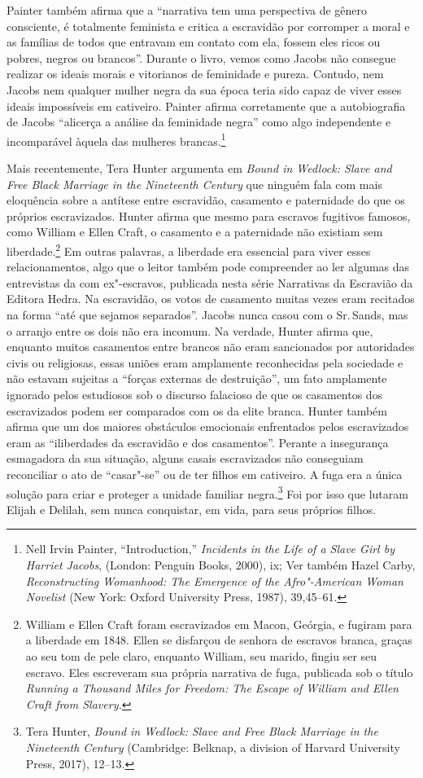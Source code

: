 Painter também afirma que a ``narrativa tem uma perspectiva de gênero
consciente, é totalmente feminista e critica a escravidão por corromper
a moral e as famílias de todos que entravam em contato com ela, fossem
eles ricos ou pobres, negros ou brancos''. Durante o livro, vemos como
Jacobs não consegue realizar os ideais morais e vitorianos de feminidade
e pureza. Contudo, nem Jacobs nem qualquer mulher negra da sua época
teria sido capaz de viver esses ideais impossíveis em cativeiro. Painter
afirma corretamente que a autobiografia de Jacobs ``alicerça a análise
da feminidade negra'' como algo independente e incomparável àquela das
mulheres brancas.\footnote{Nell Irvin Painter, ``Introduction,''
  \emph{Incidents in the Life of a Slave Girl by Harriet Jacobs},
  (London: Penguin Books, 2000), ix; Ver também Hazel Carby,
  \emph{Reconstructing Womanhood: The Emergence of the Afro"-American
  Woman Novelist} (New York: Oxford University Press, 1987), 39,45--61.}

Mais recentemente, Tera Hunter argumenta em \emph{Bound in Wedlock:
Slave and Free Black Marriage in the Nineteenth Century} que ninguém
fala com mais eloquência sobre a antítese entre escravidão, casamento e
paternidade do que os próprios escravizados. Hunter afirma que mesmo
para escravos fugitivos famosos, como William e Ellen Craft, o casamento
e a paternidade não existiam sem liberdade.\footnote{
  William e Ellen Craft foram escravizados em Macon, Geórgia, e fugiram
  para a liberdade em 1848. Ellen se disfarçou de senhora de escravos
  branca, graças ao seu tom de pele claro, enquanto William, seu marido,
  fingiu ser seu escravo. Eles escreveram sua própria narrativa de fuga,
  publicada sob o título \emph{Running a Thousand Miles for Freedom: The
  Escape of William and Ellen Craft from Slavery.}} Em outras palavras,
a liberdade era essencial para viver esses relacionamentos, algo que o
leitor também pode compreender ao ler algumas das entrevistas da  com
ex"-escravos, publicada nesta série Narrativas da Escravião da Editora
Hedra. Na escravidão, os votos de casamento muitas vezes eram recitados
na forma ``até que sejamos separados''. Jacobs nunca casou com o Sr.\,Sands, mas o arranjo entre os dois não era incomum. Na verdade, Hunter
afirma que, enquanto muitos casamentos entre brancos não eram
sancionados por autoridades civis ou religiosas, essas uniões eram
amplamente reconhecidas pela sociedade e não estavam sujeitas a ``forças
externas de destruição'', um fato amplamente ignorado pelos estudiosos
sob o discurso falacioso de que os casamentos dos escravizados podem
ser comparados com os da elite branca. Hunter também
afirma que um dos maiores obstáculos emocionais enfrentados pelos
escravizados eram as ``iliberdades da escravidão e dos casamentos''.
Perante a insegurança esmagadora da sua situação, alguns casais
escravizados não conseguiam reconciliar o ato de ``casar"-se'' ou de ter
filhos em cativeiro. A fuga era a única solução para criar e proteger a
unidade familiar negra.\footnote{Tera Hunter, \emph{Bound in Wedlock:
  Slave and Free Black Marriage in the Nineteenth Century} (Cambridge:
  Belknap, a division of Harvard University Press, 2017), 12--13.}%
  Foi por isso que lutaram Elijah e Delilah, sem nunca
conquistar, em vida, para seus próprios filhos.

